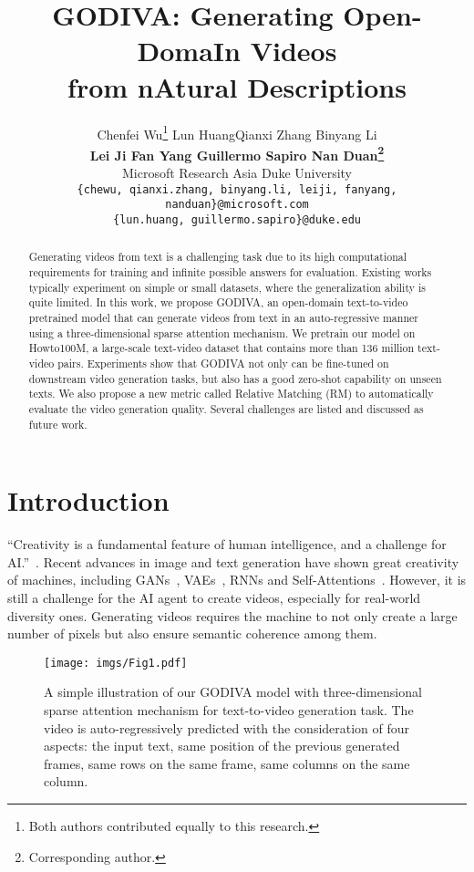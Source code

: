 \documentclass{article}
\title{GODIVA: Generating Open-DomaIn Videos\\ from nAtural Descriptions}
\author{Chenfei Wu\thanks{Both authors contributed equally to this research.} \quad Lun Huang\samethanks[1] \quad Qianxi Zhang \quad Binyang Li \\
\textbf{ Lei Ji \quad Fan Yang \quad Guillermo Sapiro \quad Nan Duan\thanks{Corresponding author.} }\\
 {\small Microsoft Research Asia \quad Duke University} \\
{\tt\small\{chewu, qianxi.zhang, binyang.li, leiji, fanyang, nanduan\}@microsoft.com}\\
{\tt\small\{lun.huang, guillermo.sapiro\}@duke.edu}}
\begin{document}
\maketitle

\begin{abstract}
Generating videos from text is a challenging task due to its high computational requirements for training and infinite possible answers for evaluation. Existing works typically experiment on simple or small datasets, where the generalization ability is quite limited. In this work, we propose GODIVA, an open-domain text-to-video pretrained model that can generate videos from text in an auto-regressive manner using a three-dimensional sparse attention mechanism. We pretrain our model on Howto100M, a large-scale text-video dataset that contains more than 136 million text-video pairs. Experiments show that GODIVA not only can be fine-tuned on downstream video generation tasks, but also has a good zero-shot capability on unseen texts. We also propose a new metric called Relative Matching (RM) to automatically evaluate the video generation quality. Several challenges are listed and discussed as future work.
\end{abstract}




\section{Introduction}
``Creativity is a fundamental feature of human intelligence, and a challenge for AI.''~\cite{bodenCreativityArtificialIntelligence1998}. Recent advances in image and text generation have shown great creativity of machines, including GANs~\cite{brockLargeScaleGAN2019,zhangSelfattentionGenerativeAdversarial2019}, VAEs~\cite{razaviGeneratingDiverseHighfidelity2019,oordNeuralDiscreteRepresentation2017}, RNNs\cite{wenSemanticallyConditionedLstmbased2015,prakashNeuralParaphraseGeneration2016} and Self-Attentions~\cite{radfordLanguageModelsAre2019}. However, it is still a challenge for the AI agent to create videos, especially for real-world diversity ones. Generating videos requires the machine to not only create a large number of pixels but also ensure semantic coherence among them. 

\begin{figure}[h]
	\centering
	\texttt{[image: imgs/Fig1.pdf]}
	\caption{A simple illustration of our GODIVA model with three-dimensional sparse attention mechanism for text-to-video generation task. The video is auto-regressively predicted with the consideration of four aspects: the input text, same position of the previous generated frames, same rows on the same frame, same columns on the same column.}
	\label{fig:small}
\end{figure}
\end{document}
